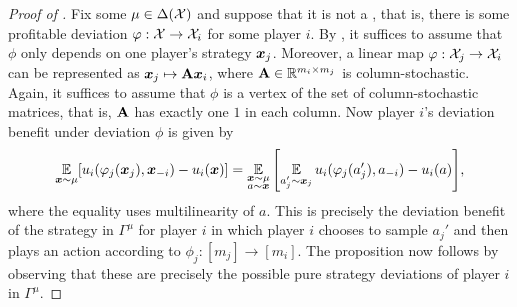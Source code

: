 \begin{proof}[Proof of ]
Fix some $\mu \in \Delta({\mathcal{X}})$ and suppose that it is not a \jlce, that is, there is some profitable deviation $\varphi : {\mathcal{X}} \to {\mathcal{X}}_i$ for some player $i$. By , it suffices to assume that $\phi$ only depends on one player's strategy ${\bm{x}}_j$. Moreover, a linear map $\varphi : {\mathcal{X}}_j \to {\mathcal{X}}_i$ can be represented as ${\bm{x}}_j \mapsto {\mathbf{A}} {\bm{x}}_i$, where ${\mathbf{A}} \in \mathbb R^{m_i \times m_j}$ is column-stochastic. Again, it suffices to assume that $\phi$ is a vertex of the set of column-stochastic matrices, that is, ${\mathbf{A}}$ has exactly one $1$ in each column. Now player $i$'s deviation benefit under deviation $\phi$ is given by
\begin{align*}
    \operatorname*{\mathbb E}_{{\bm{x}}\sim\mu} [u_i(\varphi_j({\bm{x}}_j), {\bm{x}}_{-i}) - u_i({\bm{x}})] =  \operatorname*{\mathbb E}_{\substack{{\bm{x}}\sim\mu\\a\sim{\bm{x}}}}\qty[\operatorname*{\mathbb E}_{a_j'\sim{\bm{x}}_j}u_i(\varphi_j(a_j'), a_{-i}) - u_i(a)],
\end{align*}
where the equality uses multilinearity of $a$. This is precisely the deviation benefit of the strategy in $\Gamma^\mu$ for player $i$ in which player $i$ chooses to sample $a_j'$ and then plays an action according to $\phi_j : [m_j] \to [m_i]$. The proposition now follows by observing that these are precisely the possible pure strategy deviations of player $i$ in $\Gamma^\mu$.
\end{proof}

